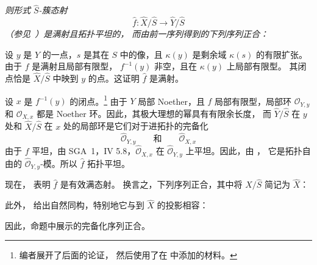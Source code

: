 {\itshape 则形式 \(\widehat S\)-簇态射
\[
  \widehat f:
  \widehat X/\widehat S
  \longrightarrow
  \widehat Y/\widehat S
\]
\textup{（参见\ ）}是满射且拓扑平坦的，
而由前一序列得到的下列序列正合：}

\begin{center}
  
\end{center}

设 \(y\) 是 \(Y\) 的一点，\(s\) 是其在 \(S\) 中的像，且 \(\kappa(y)\)
是剩余域 \(\kappa(s)\) 的有限扩张。由于 \(f\) 是满射且局部有限型，
\(f^{-1}(y)\) 非空，且在 \(\kappa(y)\) 上局部有限型。
其闭点恰是 \(\widehat X/\widehat S\) 中映到 \(y\) 的点。这证明 \(\widehat f\) 是满射。

设 \(x\) 是 \(f^{-1}(y)\) 的闭点。\footnote{编者展开了后面的论证，
然后使用了在  中添加的材料。}
由于 \(Y\) 局部 Noether，且 \(f\) 局部有限型，局部环 \(\mathcal O_{Y,y}\)
和 \(\mathcal O_{X,x}\) 都是 Noether 环。因此，其极大理想的幂具有有限余长度，
而 \(\widehat Y/\widehat S\) 在 \(y\) 处和 \(\widehat X/\widehat S\) 在
\(x\) 处的局部环是它们对于进拓扑的完备化
\[
  \widehat{\mathcal O}_{Y,y}
  \qquad\text{和}\qquad
  \widehat{\mathcal O}_{X,x}
\]
由于 \(f\) 平坦，由 SGA~1，IV 5.8，\(\widehat{\mathcal O}_{X,x}\)
在 \(\widehat{\mathcal O}_{Y,y}\) 上平坦。因此，由 ，
它是拓扑自由的 \(\widehat{\mathcal O}_{Y,y}\)-模。所以 \(\widehat f\) 拓扑平坦。

现在， 表明 \(\widehat f\) 是有效满态射。
换言之，下列序列正合，其中将 \(\widehat X/\widehat S\) 简记为 \(\widehat X\)：

\begin{center}
  
\end{center}

此外， 给出自然同构，特别地它与到
\(\widehat X\) 的投影相容：

\begin{center}
  
\end{center}

因此，命题中展示的完备化序列正合。

